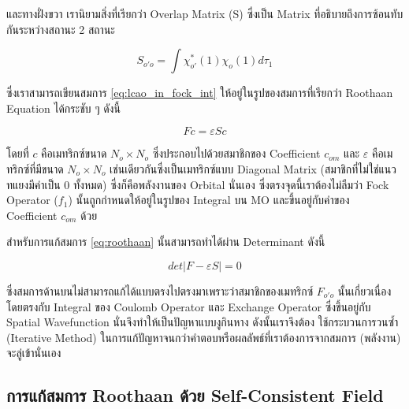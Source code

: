 \noindent และทางฝั่งขวา เรานิยามสิ่งที่เรียกว่า Overlap Matrix (S) ซึ่งเป็น Matrix ที่อธิบายถึงการซ้อนทับกันระหว่างสถานะ 2 สถานะ

\begin{equation}\label{eq:matrix_overlap}
    S_{o'o} = \int \chi^{*}_{o'}(1) \chi_{o}(1) d\tau_{1}
\end{equation}

\noindent ซึ่งเราสามารถเขียนสมการ \ref{eq:lcao_in_fock_int} ให้อยู่ในรูปของสมการที่เรียกว่า Roothaan Equation ได้กระชับ ๆ ดังนี้

\begin{equation}\label{eq:roothaan}
    F c = \varepsilon S c
\end{equation}

\noindent โดยที่ $c$ คือเมทริกซ์ขนาด $N_{o} \times N_{o}$ ซึ่งประกอบไปด้วยสมาชิกของ Coefficient $c_{om}$ และ $\varepsilon$ 
คือเมทริกซ์ที่มีขนาด $N_{o} \times N_{o}$ เช่นเดียวกันซึ่งเป็นเมทริกซ์แบบ Diagonal Matrix (สมาชิกที่ไม่ใช่แนวทแยงมีค่าเป็น 0 ทั้งหมด) 
ซึ่งก็คือพลังงานของ Orbital นั่นเอง ซึ่งตรงจุดนี้เราต้องไม่ลืมว่า Fock Operator ($f_{1}$) นั้นถูกกำหนดให้อยู่ในรูปของ Integral บน MO 
และขึ้นอยู่กับค่าของ Coefficient $c_{om}$ ด้วย

สำหรับการแก้สมการ \ref{eq:roothaan} นั้นสามารถทำได้ผ่าน Determinant ดังนี้

\begin{equation}\label{eq:scf_secular}
    det|F - \varepsilon S| = 0
\end{equation}

\noindent ซึ่งสมการด้านบนไม่สามารถแก้ได้แบบตรงไปตรงมาเพราะว่าสมาชิกของเมทริกซ์ $F_{o'o}$ นั้นเกี่ยวเนื่องโดยตรงกับ Integral ของ 
Coulomb Operator และ Exchange Operator ซึ่งขึ้นอยู่กับ Spatial Wavefunction นั่นจึงทำให้เป็นปัญหาแบบงูกินหาง ดังนั้นเราจึงต้อง%
ใช้กระบวนการวนซ้ำ (Iterative Method) ในการแก้ปัญหาจนกว่าคำตอบหรือผลลัพธ์ที่เราต้องการจากสมการ (พลังงาน) จะลู่เข้านั่นเอง

\subsection{การแก้สมการ Roothaan ด้วย Self-Consistent Field}
\label{ssec:roothaan_scf}

